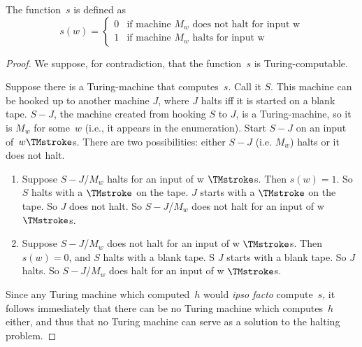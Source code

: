 \documentclass[../../include/open-logic-section]{subfiles}
\begin{document}
\begin{defn} The function~$s$ is defined as
\[
s(w) =
\begin{cases}
  \text{0} & \text{if machine~$M_w$ does not halt for input w} \\
  \text{1} & \text{if machine~$M_w$ halts for input w}
\end{cases}
\]
\end{defn}

\begin{proof}
We suppose, for contradiction, that the function~$s$ is Turing-computable.

Suppose there is a Turing-machine that computes~$s$. Call it $S$. This
machine can be hooked up to another machine $J$, where $J$ halts iff it is
started on a blank tape. $S-J$, the machine created from hooking $S$ to
$J$, is a
Turing-machine, so it is $M_w$ for some~$w$ (i.e., it appears in the
enumeration). Start $S-J$ on an input of~$w \TMstroke$s. There are two
possibilities: either $S-J$ (i.e. $M_w$) halts or it does not halt.
\begin{enumerate}
\item Suppose $S-J$/$M_w$ halts for an input of w $\TMstroke$s. Then $s(w)
= 1$. So $S$ halts with a $\TMstroke$ on the tape.
$J$ starts with a $\TMstroke$ on the tape. So $J$ does not halt. So
$S-J$/$M_w$ does not halt for an input of w $\TMstroke$s.

\item Suppose $S-J$/$M_w$ does not halt for an input of w $\TMstroke$s.
Then $s(w) = 0$, and $S$ halts with a blank tape. S $J$ starts with a blank tape.
So $J$ halts. So $S-J$/$M_w$ does halt for an input of w $\TMstroke$s.
\end{enumerate}

Since any Turing machine which computed~$h$ would \emph{ipso facto}
compute~$s$, it follows immediately that there can be no Turing machine
which computes~$h$ either, and thus that no Turing machine can serve as a
solution to the halting problem.
\end{proof}
\end{document}

